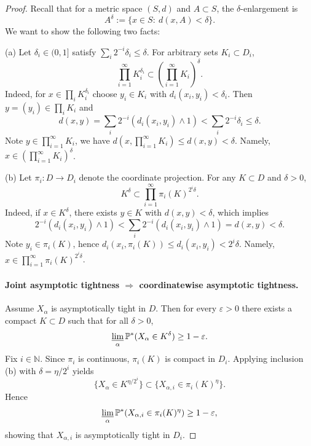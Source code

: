 \documentclass[12pt]{article}
\renewcommand{\(}{\left(}%
\renewcommand{\)}{\right)}%
\renewcommand{\[}{\left[}%
\renewcommand{\]}{\right]}%
\newtheorem{proof}{Proof.}}
\begin{document}
\begin{proof}
Recall that for a metric space $(S,d)$ and $A\subset S$, the $\delta$-enlargement is
\begin{equation*}
A^\delta := \{x\in S:\ d(x,A)<\delta\}.
\end{equation*}
We want to show the following two facts:

\smallskip
\noindent
(a) Let $\delta_i\in(0,1]$ satisfy $\sum_i 2^{-i}\delta_i\le\delta$. For arbitrary sets
$K_i\subset D_i$,
\begin{equation*}
\prod_{i=1}^\infty K_i^{\delta_i}
\subset
\(\prod_{i=1}^\infty K_i\)^\delta.
\end{equation*}
Indeed, for $x\in\prod_i K_i^{\delta_i}$ choose $y_i\in K_i$ with
$d_i(x_i,y_i)<\delta_i$. Then $y=(y_i)\in\prod_i K_i$ and
\begin{equation*}
d(x,y)
=\sum_i 2^{-i}(d_i(x_i,y_i)\wedge1)
< \sum_i 2^{-i}\delta_i
\le \delta.
\end{equation*}
Note $y\in \prod_{i=1}^\infty K_i$, we have $d(x,\prod_{i=1}^\infty K_i)\leq d(x,y)<\delta$. Namely, $x\in \(\prod_{i=1}^\infty K_i\)^\delta$.

\smallskip
\noindent
(b) Let $\pi_i:D\to D_i$ denote the coordinate projection. For any $K\subset D$ and
$\delta>0$,
\begin{equation*}
K^\delta \subset \prod_{i=1}^\infty \pi_i(K)^{2^i\delta}.
\end{equation*}
Indeed, if $x\in K^\delta$, there exists $y\in K$ with $d(x,y)<\delta$, which implies
\begin{equation*}
2^{-i}(d_i(x_i,y_i)\wedge1)<\sum_i 2^{-i}(d_i(x_i,y_i)\wedge1)=d(x,y)<\delta.
\end{equation*}
Note $y_i\in \pi_i(K)$, hence $d_i(x_i,\pi_i(K))\leq d_i(x_i,y_i)<2^i\delta$. Namely, $x\in \prod_{i=1}^\infty \pi_i(K)^{2^i\delta}$.

\paragraph{Joint asymptotic tightness $\Longrightarrow$ coordinatewise asymptotic tightness.}

Assume $X_\alpha$ is asymptotically tight in $D$. Then for every $\varepsilon>0$ there
exists a compact $K\subset D$ such that for all $\delta>0$,
\begin{equation*}
\varliminf_\alpha \mathbb P^*(X_\alpha\in K^\delta)\ge 1-\varepsilon.
\end{equation*}
Fix $i\in\mathbb N$. Since $\pi_i$ is continuous, $\pi_i(K)$ is compact in $D_i$.
Applying inclusion (b) with $\delta=\eta/2^i$ yields
\begin{equation*}
\{X_\alpha\in K^{\eta/2^i}\}
\subset
\{X_{\alpha,i}\in \pi_i(K)^\eta\}.
\end{equation*}
Hence
\begin{equation*}
\varliminf_\alpha \mathbb P^*(X_{\alpha,i}\in \pi_i(K)^\eta)
\ge 1-\varepsilon,
\end{equation*}
showing that $X_{\alpha,i}$ is asymptotically tight in $D_i$.


\end{proof}
\end{document}
